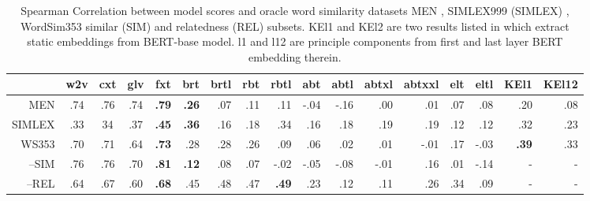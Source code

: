 \documentclass[letterpaper]{article} %
\begin{document}
\begin{table}%
\centering

\begin{tabular}{rcccc|rrrrrrrrrrrr}
 & w2v & cxt & glv & fxt & brt & brtl & rbt& rbtl &abt & abtl & abtxl & abtxxl & elt& eltl& KEl1 & KEl12\\
 \hline
MEN & .74 & .76 & .74 & \textbf{.79} & \textbf{.26} & .07 & .11 & .11 & -.04 & -.16 & .00 & .01 & .07 & .08 & .20 & .08\\
SIMLEX & .33 & 34 &.37 & \textbf{.45} & \textbf{.36} & .16& .18 & .34 & .16 & .18 &.19 & .19 &.12 & .12 & .32 & .23  \\
WS353 & .70 & .71 & .64 & \textbf{.73} &.28 & .28 &.26 & .09 &.06 &.02 & .01 & -.01 & .17 & -.03 & \textbf{.39}&.33 \\
--SIM & .76 & .76 & .70 & \textbf{.81} &\textbf{.12} & .08 & .07 & -.02 & -.05 & -.08 & -.01 & .16 & .01 & -.14 & - & - \\
--REL & .64 & .67 & .60 & \textbf{.68}& .45 & .48 & .47 & \textbf{.49} & .23 & .12 &.11 & .26 & .34 & .09 & - & -  \\
\end{tabular}
\caption{Spearman Correlation between model scores and oracle word similarity datasets MEN \cite{bruni2014multimodal}, SIMLEX999 (SIMLEX) \cite{hill2015simlex}, WordSim353 \cite{finkelstein2002placing} similar (SIM) and relatedness (REL) subsets. KEl1 and KEl2 are two results listed in \cite{Ethayarajh2019HowCA} which extract static embeddings from  BERT-base model. l1 and l12 are principle components from first and last layer BERT embedding therein.}
\label{tab:3}
\end{table}
\end{document}
